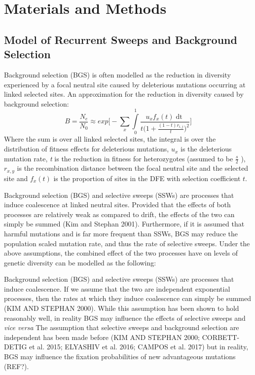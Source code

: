 \documentclass[11pt]{article}
\begin{document}
\section*{Materials and Methods}

	\subsection*{Model of Recurrent Sweeps and Background Selection}
Background selection (BGS) is often modelled as the reduction in diversity experienced by a focal neutral site caused by deleterious mutations occurring at linked selected sites. An approximation for the reduction in diversity caused by background selection:
\begin{equation}
B = \frac{N_{e}}{N_{0}} \approx exp\Bigg[- \sum \limits_{x} \int \limits_{0}^1 \frac{u_{x}f_x(t)\mathop{dt}}{t \Big( 1 + \frac{(1-t)r_{i,j}}{t} \Big)^2} \Bigg]
\end{equation}
Where the sum is over all linked selected sites, the integral is over the distribution of fitness effects for deleterious mutations, \emph{$u_{x}$} is the deleterious mutation rate, \emph{t} is the reduction in fitness for heterozygotes (assumed to be \(\frac{s}{2}\) ), $r_{x,y}$  is the recombination distance between the focal neutral site and the selected site and $f_x(t)$ is the proportion of sites in the DFE with selection coefficient $t$.

	Background selection (BGS) and selective sweeps (SSWs) are processes that induce coalescence at linked neutral sites. Provided that the effects of both processes are relatively weak as compared to drift, the effects of the two can simply be summed (Kim and Stephan 2001). Furthermore, if it is assumed that harmful mutations and is far more frequent than SSWs, BGS may reduce the population scaled mutation rate, and thus the rate of selective sweeps. Under the above assumptions, the combined effect of the two processes have on levels of genetic diversity can be modelled as the following:
	

	Background selection (BGS) and selective sweeps (SSWs) are processes that induce coalescence. If we assume that the two are independent exponential processes, then the rates at which they induce coalescence can simply be summed (KIM AND STEPHAN 2000). While this assumption has been shown to hold reasonably well, in reality BGS may influence the effects of selective sweeps and \emph{vice versa}
	The assumption that selective sweeps and background selection are independent has been made before (KIM AND STEPHAN 2000; CORBETT-DETIG et al. 2015; ELYASHIV et al. 2016; CAMPOS et al. 2017) but in reality, BGS may influence the fixation probabilities of new advantageous mutations (REF?). 
\end{document}
